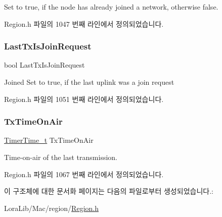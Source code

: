 Set to true, if the node has already joined a network, otherwise false. 

Region.\+h 파일의 1047 번째 라인에서 정의되었습니다.

\mbox{\label{structs_calc_back_off_params_a4088d0ca2ff21fd5cdc110e14816dd53}} 
\subsubsection{\texorpdfstring{Last\+Tx\+Is\+Join\+Request}{LastTxIsJoinRequest}}
{\footnotesize\ttfamily bool Last\+Tx\+Is\+Join\+Request}

Joined Set to true, if the last uplink was a join request 

Region.\+h 파일의 1051 번째 라인에서 정의되었습니다.

\mbox{\label{structs_calc_back_off_params_aa17a8607485db100d315e74853dd217e}} 
\subsubsection{\texorpdfstring{Tx\+Time\+On\+Air}{TxTimeOnAir}}
{\footnotesize\ttfamily \mbox{\hyperlink{utilities_8h_a4215ca43d3e953099ea758ce428599d0}{Timer\+Time\+\_\+t}} Tx\+Time\+On\+Air}

Time-\/on-\/air of the last transmission. 

Region.\+h 파일의 1067 번째 라인에서 정의되었습니다.



이 구조체에 대한 문서화 페이지는 다음의 파일로부터 생성되었습니다.\+:\begin{DoxyCompactItemize}
\item 
Lora\+Lib/\+Mac/region/\mbox{\hyperlink{_region_8h}{Region.\+h}}\end{DoxyCompactItemize}
